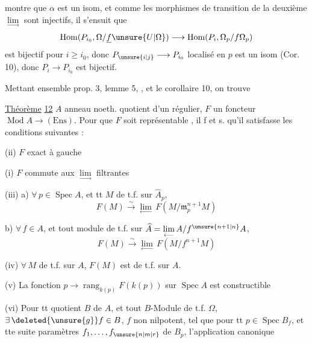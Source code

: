 montre que $\alpha$ est un isom, et comme les morphismes de transition de la deuxième $\underset{\longrightarrow}{\lim}$ sont injectifs, il s'ensuit que
\[
 \operatorname{Hom}(P_{i_0},\Omega/\underline f\unsure{U|\Omega})\longrightarrow
 \operatorname{Hom}(P_i,\Omega_p/f\Omega_p)
\]
est bijectif pour $i\geq i_0$, donc $P_{\unsure{i|j}}\longrightarrow P_{i_0}$ localisé en $p$ est un isom (Cor. 10), donc $P_i\longrightarrow P_{i_0}$ est bijectif.

Mettant ensemble prop. 3, lemme 5,  , et le corollaire 10, on trouve

\uline{Théorème} \uline{12} $A$ anneau noeth. quotient d'un régulier, $F$ un foncteur $\operatorname{Mod} A\longrightarrow(\mathrm{Ens})$. Pour que $F$ soit représentable , il f et s. qu'il satisfasse les conditions suivantes :

(ii) $F$ exact à gauche

(i) $F$ commute aux $\underset{\longrightarrow}{\lim}$ filtrantes

(iii) a) $\forall\,p\in\operatorname{Spec}A$, et tt $M$ de t.f. sur $\widehat A_p$,
\[
 F(M)\overset{\sim}{\longrightarrow}\underset{\longleftarrow}{\lim}\,F(M/\mathfrak m_p^{n+1}M)
\]

b) $\forall\, f\in A$, et tout module de t.f. sur $\widehat A=\underset{\longleftarrow}{\lim}\,A/f^{\unsure{n+1|n}}A$,
\[
 F(M)\overset{\sim}{\longrightarrow}\underset{\longleftarrow}{\lim}\,F(M/f^{n+1}M)
\]

(iv) $\forall\, M$ de t.f. sur $A$, $F(M)$ est de t.f. sur $A$.

(v) La fonction $p\longrightarrow\operatorname{rang}_{k(p)}F(k(p))$ sur $\operatorname{Spec}A$ est constructible

(vi) Pour tt quotient  $B$ de $A$, et tout $B$-Module de t.f. $\Omega$, $\exists\,\deleted{\unsure{g}}f\in B$, $f$ non nilpotent, tel que pour tt $p\in\operatorname{Spec}B_f$, et tte suite   paramètres $f_1,\ldots,f_{\unsure{n|m|r}}$ de $B_p$, l'application canonique
